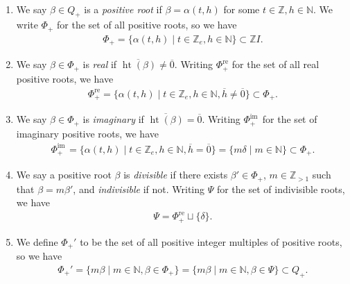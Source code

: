 \documentclass[Unicode,ALCO]{cedram}
\newcommand{\im}{\operatorname{im}}
\newcommand{\height}{\operatorname{ht}}
\newcommand{\0}{{\bar 0}}
\newcommand{\ZZ}{{\mathbb Z}}
\newcommand{\NN}{{\mathbb N}}
\def\height{{\operatorname{ht}}}
\def\height{{\operatorname{ht}}}
\def\re{{\mathrm{re}}}
\def\im{{\mathrm{im}\,}}
\begin{document}
\begin{defi} \(\)
\begin{enumerate}
\item
We say \(\beta \in Q_+\) is a {\em positive root} if \(\beta = \alpha(t,h)\) for some \(t \in \ZZ, h \in \NN\). We write \(\Phi_+\) for the set of all positive roots, so we have
\begin{align}
\Phi_+ = \{ \alpha(t,h) \mid t \in \ZZ_e, h \in \NN\} \subset \ZZ I.
\end{align}
\item We say \(\beta \in \Phi_+\) is {\em real} if \(\overline{\height(\beta)} \neq \overline 0\). Writing \(\Phi_+^\re\) for the set of all real positive roots, we have
\begin{align}
\Phi_+^\re =  \{ \alpha(t,h) \mid t \in \ZZ_e, h \in \NN, \overline h \neq \overline 0\} \subset \Phi_+.
\end{align}
\item We say \(\beta \in \Phi_+\) is {\em imaginary} if \(\overline{\height(\beta)} = \overline 0\).  Writing \(\Phi_+^\im\) for the set of imaginary positive roots, we have
\begin{align}\label{allimag}
\Phi_+^\im =  \{ \alpha(t,h) \mid t \in \ZZ_e, h \in \NN, \overline h = \overline 0\} = \{m \delta \mid m \in\NN \} \subset \Phi_+.
\end{align}
\item We say a positive root \(\beta\) is {\em divisible} if there exists \(\beta' \in \Phi_+\), \(m \in \ZZ_{>1}\) such that \(\beta= m \beta'\), and {\em indivisible} if not. Writing \(\Psi\) for the set of indivisible roots, we have
\begin{align}\label{PsiDef}
\Psi = \Phi_+^\re \sqcup \{ \delta\} .
\end{align}
\item We define \(\Phi_+'\) to be the set of all positive integer multiples of positive roots, so we have
\begin{align}\label{multphi}
\Phi_+' = \{m \beta \mid m \in \NN, \beta \in \Phi_+\} = \{m \beta \mid m \in \NN, \beta \in \Psi\} \subset Q_+.
\end{align}
\end{enumerate}
\end{defi}
\end{document}
